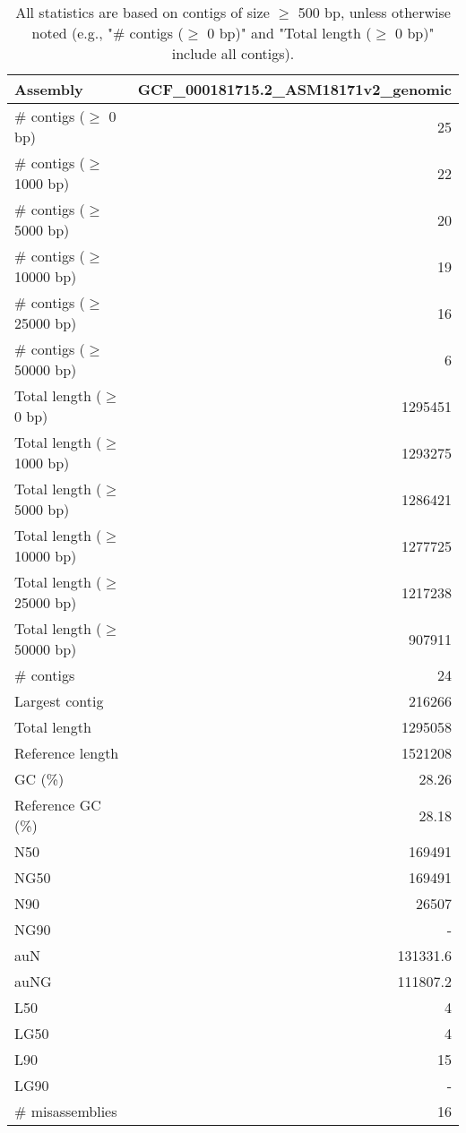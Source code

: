 \documentclass[12pt,a4paper]{article}
\begin{document}
\begin{table}[ht]
\begin{center}
\caption{All statistics are based on contigs of size $\geq$ 500 bp, unless otherwise noted (e.g., "\# contigs ($\geq$ 0 bp)" and "Total length ($\geq$ 0 bp)" include all contigs).}
\begin{tabular}{|l*{1}{|r}|}
\hline
Assembly & GCF\_000181715.2\_ASM18171v2\_genomic \\ \hline
\# contigs ($\geq$ 0 bp) & 25 \\ \hline
\# contigs ($\geq$ 1000 bp) & 22 \\ \hline
\# contigs ($\geq$ 5000 bp) & 20 \\ \hline
\# contigs ($\geq$ 10000 bp) & 19 \\ \hline
\# contigs ($\geq$ 25000 bp) & 16 \\ \hline
\# contigs ($\geq$ 50000 bp) & 6 \\ \hline
Total length ($\geq$ 0 bp) & 1295451 \\ \hline
Total length ($\geq$ 1000 bp) & 1293275 \\ \hline
Total length ($\geq$ 5000 bp) & 1286421 \\ \hline
Total length ($\geq$ 10000 bp) & 1277725 \\ \hline
Total length ($\geq$ 25000 bp) & 1217238 \\ \hline
Total length ($\geq$ 50000 bp) & 907911 \\ \hline
\# contigs & 24 \\ \hline
Largest contig & 216266 \\ \hline
Total length & 1295058 \\ \hline
Reference length & 1521208 \\ \hline
GC (\%) & 28.26 \\ \hline
Reference GC (\%) & 28.18 \\ \hline
N50 & 169491 \\ \hline
NG50 & 169491 \\ \hline
N90 & 26507 \\ \hline
NG90 & - \\ \hline
auN & 131331.6 \\ \hline
auNG & 111807.2 \\ \hline
L50 & 4 \\ \hline
LG50 & 4 \\ \hline
L90 & 15 \\ \hline
LG90 & - \\ \hline
\# misassemblies & 16 \\ \hline

\end{tabular}
\end{center}
\end{table}
\end{document}

